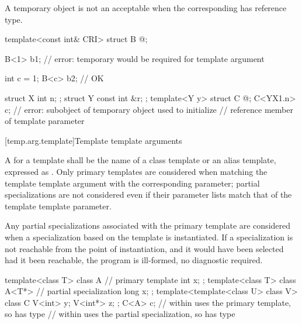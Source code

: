 \pnum
\begin{note}
A temporary object
is not an acceptable
when the corresponding
has reference type.
\begin{example}
\begin{codeblock}
template<const int& CRI> struct B { @\commentellip@ };

B<1> b1;                        // error: temporary would be required for template argument

int c = 1;
B<c> b2;                        // OK

struct X { int n; };
struct Y { const int &r; };
template<Y y> struct C { @\commentellip@ };
C<Y{X{1}.n}> c;                 // error: subobject of temporary object used to initialize
                                // reference member of template parameter
\end{codeblock}
\end{example}
\end{note}

[temp.arg.template]{Template template arguments}

\pnum
A
for a template
shall be the name of a class template or an alias template, expressed as
.
Only primary templates are considered when matching the template template
argument with the corresponding parameter; partial specializations are not
considered even if their parameter lists match that of the template template
parameter.

\pnum
Any partial specializations associated with the
primary template are considered when a
specialization based on the template
is instantiated.
If a specialization is not reachable from the point of instantiation,
and it would have been selected had it been reachable, the program is ill-formed,
no diagnostic required.
\begin{example}
\begin{codeblock}
template<class T> class A {     // primary template
  int x;
};
template<class T> class A<T*> { // partial specialization
  long x;
};
template<template<class U> class V> class C {
  V<int>  y;
  V<int*> z;
};
C<A> c;             //  within  uses the primary template, so  has type 
                    //  within  uses the partial specialization, so  has type 
\end{codeblock}
\end{example}

